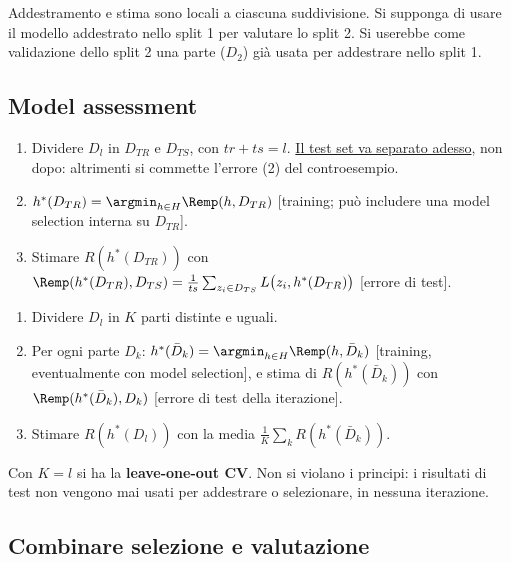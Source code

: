 \begin{attenzione}
Addestramento e stima sono locali a ciascuna suddivisione. Si supponga di usare il modello addestrato nello split
1 per valutare lo split 2. Si userebbe come validazione dello split 2 una parte ($D_2$) già usata per addestrare
nello split 1.
\end{attenzione}

\subsection{Model assessment}

\begin{algoritmo}
\begin{enumerate}
  \item Dividere $D_l$ in $D_{TR}$ e $D_{TS}$, con $tr+ts=l$. \uline{Il test set va separato adesso}, non dopo:
        altrimenti si commette l'errore (2) del controesempio.
  \item $h^*(D_{TR}) = \argmin_{h\in H}\Remp(h,D_{TR})$ [training; può includere una model selection interna su
        $D_{TR}$].
  \item Stimare $R(h^*(D_{TR}))$ con $\Remp(h^*(D_{TR}),D_{TS}) = \frac{1}{ts}\sum_{z_i\in D_{TS}}L\big(z_i,h^*(D_{TR})\big)$
        [errore di test].
\end{enumerate}
\end{algoritmo}

\begin{algoritmo}
\begin{enumerate}
  \item Dividere $D_l$ in $K$ parti distinte e uguali.
  \item Per ogni parte $D_k$: $h^*(\bar D_k) = \argmin_{h\in H}\Remp(h,\bar D_k)$ [training, eventualmente con
        model selection], e stima di $R(h^*(\bar D_k))$ con $\Remp(h^*(\bar D_k),D_k)$ [errore di test della
        iterazione].
  \item Stimare $R(h^*(D_l))$ con la media $\frac1K\sum_kR(h^*(\bar D_k))$.
\end{enumerate}
\end{algoritmo}

Con $K=l$ si ha la \textbf{leave-one-out CV}. Non si violano i principi: i risultati di test non vengono mai usati
per addestrare o selezionare, in nessuna iterazione.

\subsection{Combinare selezione e valutazione}
\label{sec:schemi-combinati}

